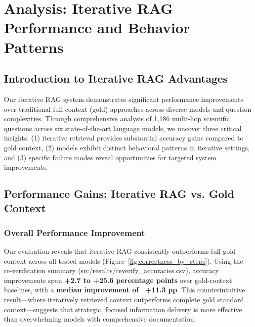 \section{Analysis: Iterative RAG Performance and Behavior Patterns}

\subsection{Introduction to Iterative RAG Advantages}

Our iterative RAG system demonstrates significant performance improvements over traditional full-context (gold) approaches across diverse models and question complexities. Through comprehensive analysis of 1,186 multi-hop scientific questions across six state-of-the-art language models, we uncover three critical insights: (1) iterative retrieval provides substantial accuracy gains compared to gold context, (2) models exhibit distinct behavioral patterns in iterative settings, and (3) specific failure modes reveal opportunities for targeted system improvements.

\subsection{Performance Gains: Iterative RAG vs. Gold Context}

\subsubsection{Overall Performance Improvement}

Our evaluation reveals that iterative RAG consistently outperforms full gold context across all tested models (Figure~\ref{fig:correctness_by_steps}). Using the re-verification summary (src/results/reverify_accuracies.csv), accuracy improvements span \textbf{+2.7 to +25.6 percentage points} over gold-context baselines, with a \textbf{median improvement of ~+11.3 pp}. This counterintuitive result---where iteratively retrieved context outperforms complete gold standard context---suggests that strategic, focused information delivery is more effective than overwhelming models with comprehensive documentation.

